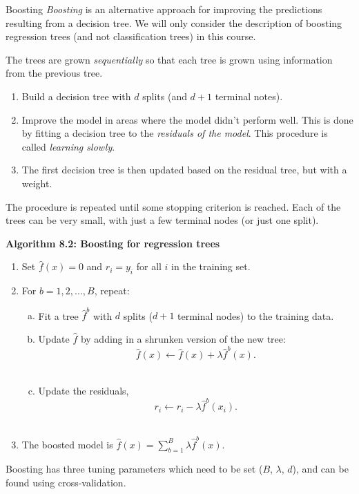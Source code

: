 \documentclass[
  10pt,
  ignorenonframetext,
]{beamer}
\providecommand{\tightlist}{%
  \setlength{\itemsep}{0pt}\setlength{\parskip}{0pt}}
\begin{document}
\begin{frame}{Boosting}
\protect\hypertarget{boosting}{}
\emph{Boosting} is an alternative approach for improving the predictions
resulting from a decision tree. We will only consider the description of
boosting regression trees (and not classification trees) in this course.

The trees are grown \emph{sequentially} so that each tree is grown using
information from the previous tree.

\begin{enumerate}
\tightlist
\item
  Build a decision tree with \(d\) splits (and \(d+1\) terminal notes).
\item
  Improve the model in areas where the model didn't perform well. This
  is done by fitting a decision tree to the \emph{residuals of the
  model}. This procedure is called \emph{learning slowly}.
\item
  The first decision tree is then updated based on the residual tree,
  but with a weight.
\end{enumerate}

The procedure is repeated until some stopping criterion is reached. Each
of the trees can be very small, with just a few terminal nodes (or just
one split).
\end{frame}

\begin{frame}
\textbf{Algorithm 8.2: Boosting for regression trees}

\begin{enumerate}
\tightlist
\item
  Set \(\hat{f}(x) = 0\) and \(r_i = y_i\) for all \(i\) in the training
  set.
\item
  For \(b=1,2,...,B\), repeat:

  \begin{enumerate}
  [a)]
  \tightlist
  \item
    Fit a tree \(\hat{f}^b\) with \(d\) splits (\(d+1\) terminal nodes)
    to the training data.\\
  \item
    Update \(\hat{f}\) by adding in a shrunken version of the new tree:
    \[\hat{f}(x) \leftarrow \hat{f}(x)+\lambda \hat{f}^b(x).\]\\
  \item
    Update the residuals,
    \[r_i \leftarrow r_i - \lambda \hat{f}^b(x_i).\]\\
  \end{enumerate}
\item
  The boosted model is
  \(\hat{f}(x) = \sum_{b=1}^B \lambda \hat{f}^b(x).\)
\end{enumerate}

Boosting has three tuning parameters which need to be set (\(B\),
\(\lambda\), \(d\)), and can be found using cross-validation.
\end{frame}
\end{document}
